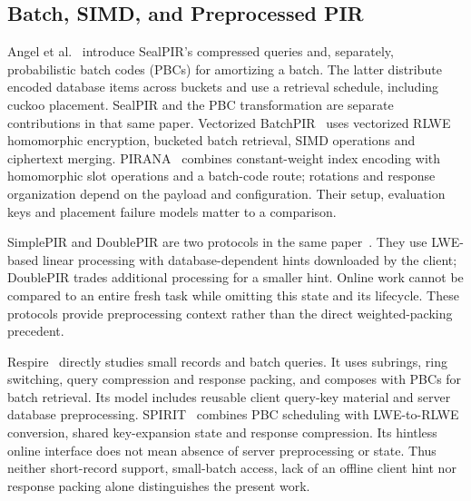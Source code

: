 \subsection{Batch, SIMD, and Preprocessed PIR}
Angel et al.~\cite{angel2018pir} introduce SealPIR's compressed queries
and, separately, probabilistic batch codes (PBCs) for amortizing a batch.
The latter distribute encoded database items across buckets and use a
retrieval schedule, including cuckoo placement. SealPIR and the PBC
transformation are separate contributions in that same paper.
Vectorized BatchPIR~\cite{vectorized2023} uses vectorized RLWE homomorphic
encryption, bucketed batch retrieval, SIMD operations and ciphertext merging.
PIRANA~\cite{pirana2024} combines constant-weight index encoding with
homomorphic slot operations and a batch-code route; rotations and response
organization depend on the payload and configuration. Their setup,
evaluation keys and placement failure models matter to a comparison.

SimplePIR and DoublePIR are two protocols in the same
paper~\cite{henzinger2023one}. They use LWE-based linear processing with
database-dependent hints downloaded by the client; DoublePIR trades
additional processing for a smaller hint. Online work cannot be compared
to an entire fresh task while omitting this state and its lifecycle.
These protocols provide preprocessing context rather than the direct
weighted-packing precedent.

Respire~\cite[Secs.~2--4]{respire2024} directly studies small records and
batch queries. It uses subrings, ring switching, query compression and
response packing, and composes with PBCs for batch retrieval. Its model
includes reusable client query-key material and server database
preprocessing. SPIRIT~\cite[Secs.~2--5]{spirit2026} combines PBC scheduling
with LWE-to-RLWE conversion, shared key-expansion state and response
compression. Its hintless online interface does not mean absence of
server preprocessing or state. Thus neither short-record support,
small-batch access, lack of an offline client hint nor response packing
alone distinguishes the present work.

